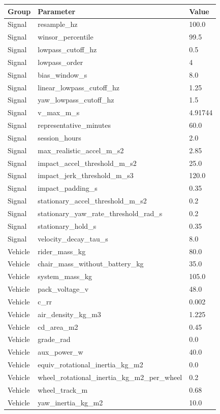 \begin{longtable}{lll}
\toprule
Group & Parameter & Value \\
\midrule
Signal & resample\_hz & 100.0 \\
Signal & winsor\_percentile & 99.5 \\
Signal & lowpass\_cutoff\_hz & 0.5 \\
Signal & lowpass\_order & 4 \\
Signal & bias\_window\_s & 8.0 \\
Signal & linear\_lowpass\_cutoff\_hz & 1.25 \\
Signal & yaw\_lowpass\_cutoff\_hz & 1.5 \\
Signal & v\_max\_m\_s & 4.91744 \\
Signal & representative\_minutes & 60.0 \\
Signal & session\_hours & 2.0 \\
Signal & max\_realistic\_accel\_m\_s2 & 2.85 \\
Signal & impact\_accel\_threshold\_m\_s2 & 25.0 \\
Signal & impact\_jerk\_threshold\_m\_s3 & 120.0 \\
Signal & impact\_padding\_s & 0.35 \\
Signal & stationary\_accel\_threshold\_m\_s2 & 0.2 \\
Signal & stationary\_yaw\_rate\_threshold\_rad\_s & 0.2 \\
Signal & stationary\_hold\_s & 0.35 \\
Signal & velocity\_decay\_tau\_s & 8.0 \\
Vehicle & rider\_mass\_kg & 80.0 \\
Vehicle & chair\_mass\_without\_battery\_kg & 35.0 \\
Vehicle & system\_mass\_kg & 105.0 \\
Vehicle & pack\_voltage\_v & 48.0 \\
Vehicle & c\_rr & 0.002 \\
Vehicle & air\_density\_kg\_m3 & 1.225 \\
Vehicle & cd\_area\_m2 & 0.45 \\
Vehicle & grade\_rad & 0.0 \\
Vehicle & aux\_power\_w & 40.0 \\
Vehicle & equiv\_rotational\_inertia\_kg\_m2 & 0.0 \\
Vehicle & wheel\_rotational\_inertia\_kg\_m2\_per\_wheel & 0.2 \\
Vehicle & wheel\_track\_m & 0.68 \\
Vehicle & yaw\_inertia\_kg\_m2 & 10.0 \\

\end{longtable}
